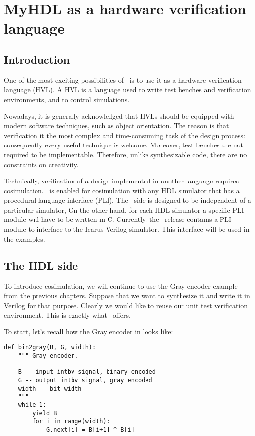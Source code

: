 \chapter{MyHDL as a hardware verification language}

\section{Introduction}

One of the most exciting possibilities of \myhdl\
is to use it as a hardware verification language (HVL).
A HVL is a language used to write test benches and
verification environments, and to control simulations.

Nowadays, it is generally acknowledged that HVLs should be equipped
with modern software techniques, such as object orientation. The
reason is that verification it the most complex and time-consuming
task of the design process: consequently every useful technique is
welcome. Moreover, test benches are not required to be
implementable. Therefore, unlike synthesizable code, there
are no constraints on creativity.

Technically, verification of a design implemented in
another language requires cosimulation. \myhdl\ is 
enabled for cosimulation with any HDL simulator that
has a procedural language interface (PLI). The \myhdl\
side is designed to be independent of a particular
simulator, On the other hand, for each HDL simulator a specific
PLI module will have to be written in C. Currently,
the \myhdl\ release contains a PLI module to interface
to the Icarus Verilog simulator. This interface will
be used in the examples.

\section{The HDL side}

To introduce cosimulation, we will continue to use the Gray encoder
example from the previous chapters. Suppose that we want to
synthesize it and write it in Verilog for that purpose. Clearly we would
like to reuse our unit test verification environment. This is exactly
what \myhdl\ offers.

To start, let's recall how the Gray encoder in \myhdl{} looks like:

\begin{verbatim}
def bin2gray(B, G, width):
    """ Gray encoder.

    B -- input intbv signal, binary encoded
    G -- output intbv signal, gray encoded
    width -- bit width
    """
    while 1:
        yield B
        for i in range(width):
            G.next[i] = B[i+1] ^ B[i]

\end{verbatim}

